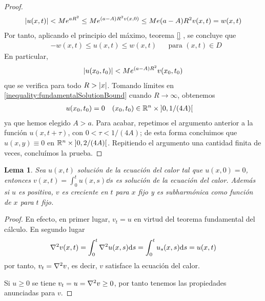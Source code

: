 \documentclass{article}
\newcommand{\realNumbers}{\mathbb{R}}
\newtheorem{lemma}{Lema}
\theoremstyle{definition}
\theoremstyle{remark}
\newcommand{\leftOpenInterval}{\left]}
\newcommand{\rightOpenInterval}{\right[}
\newcommand{\leftClosedInterval}{\left[}
\newcommand{\rightClosedInterval}{\right]}
\newcommand{\interval}[3]{%
  \ifstrequal{#1}{oo}{%
    \leftOpenInterval #2, #3 \rightOpenInterval%
  }{%
    \ifstrequal{#1}{co}{%
      \leftClosedInterval #2, #3 \rightOpenInterval%
    }{%
      \ifstrequal{#1}{oc}{
        \leftOpenInterval #2, #3 \rightClosedInterval%
      }{%
        \ifstrequal{#1}{cc}{
          \leftClosedInterval #2, #3 \rightClosedInterval
        }{%
        }%
      }%
    }%
  }%
}
\begin{document}
\begin{proof}
    \begin{align}
      \abs{u(x, t)}
      <
      M e^{a R^2}
      \leq
      M e^{(a - A) R^2 v(x, 0)}
      \leq
      M e {(a - A) R^2} v(x, t)
      =
      w(x, t)
    \end{align}
    Por tanto, aplicando el principio del máximo, teorema 
    \ref{}  %
    , se concluye que
    \begin{align}
      &- w(x, t) \leq u(x, t) \leq w(x, t)
      && \text{para } (x, t) \in D
    \end{align}
    En particular,
    \begin{align}
      \label{inequality:fundamentalSolutionBound}
      \abs{u(x_0, t_0)}
      <
      M e^{(a - A) R^2} v(x_0, t_0)
    \end{align}
    que se verifica para todo \(R > \abs{x}\).
    Tomando límites en \ref{inequality:fundamentalSolutionBound} cuando \(R \rightarrow \infty\), obtenemos
    \begin{align}
      &u(x_0, t_0) = 0
      && (x_0, t_0) \in \realNumbers^n \times \interval{oo}{0}{1 / (4 A)}
    \end{align}
    ya que hemos elegido \(A > a\).
    Para acabar, repetimos el argumento anterior a la función \(u(x, t + \tau)\), con \(0 < \tau < 1 / (4 A)\);
    de esta forma concluimos que \(u(x, y) \equiv 0\) en \(\realNumbers^n \times \interval{oo}{0}{ 2 / (4 A)}\).
    Repitiendo el argumento una cantidad finita de veces, concluímos la prueba.
  \end{proof}

  \begin{lemma} %
    Sea \(u(x, t)\) solución de la ecuación del calor tal que \(u(x,0) = 0\), entonces \(v(x, t) = \int_0^t u(x, s) \dd s\) es solución de la ecuación del calor.
    Además si \(u\) es positiva, \(v\) es creciente en \(t\) para \(x\) fijo y es subharmónica como función de \(x\) para \(t\) fijo.
  \end{lemma}
  \begin{proof}
    En efecto, en primer lugar, \(v_t = u\) en virtud del teorema fundamental del cálculo.
    En segundo lugar
    \begin{align}
      \laplacian v (x , t)
      =
      \int_0^t \laplacian u (x, s) \dd s
      =
      \int_0^t u_s(x, s) \dd s
      =
      u(x, t)
    \end{align}
    por tanto, \(v_t = \laplacian v\), es decir, \(v\) satisface la ecuación del calor.

    Si \(u \geq 0\) se tiene \(v_t = u = \laplacian v \geq 0\), por tanto tenemos las propiedades anunciadas para \(v\).
  \end{proof}
\end{document}
